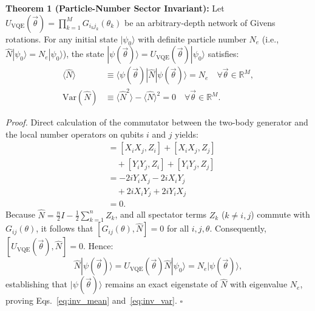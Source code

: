 \documentclass[aps,pra,reprint,superscriptaddress,floatfix,nofootinbib]{revtex4-2}
\begin{document}
\textbf{Theorem 1 (Particle-Number Sector Invariant):} 
Let $U_{\text{VQE}}(\vec{\theta}) = \prod_{k=1}^M G_{i_k j_k}(\theta_k)$ be an arbitrary-depth network of Givens rotations. For any initial state $|\psi_0\rangle$ with definite particle number $N_e$ (i.e., $\hat{N}|\psi_0\rangle = N_e |\psi_0\rangle$), the state $|\psi(\vec{\theta})\rangle = U_{\text{VQE}}(\vec{\theta})|\psi_0\rangle$ satisfies:
\begin{align}
\langle \hat{N} \rangle &\equiv \langle \psi(\vec{\theta}) | \hat{N} | \psi(\vec{\theta}) \rangle = N_e \quad \forall \vec{\theta} \in \mathbb{R}^M, \label{eq:inv_mean} \\
\text{Var}(\hat{N}) &\equiv \langle \hat{N}^2 \rangle - \langle \hat{N} \rangle^2 = 0 \quad \forall \vec{\theta} \in \mathbb{R}^M. \label{eq:inv_var}
\end{align}

\emph{Proof.} Direct calculation of the commutator between the two-body generator and the local number operators on qubits $i$ and $j$ yields:
\begin{align}
[X_i X_j + Y_i Y_j, Z_i + Z_j] &= [X_i X_j, Z_i] + [X_i X_j, Z_j] \nonumber \\
&\quad + [Y_i Y_j, Z_i] + [Y_i Y_j, Z_j] \nonumber \\
&= -2i Y_i X_j - 2i X_i Y_j \nonumber \\
&\quad + 2i X_i Y_j + 2i Y_i X_j \nonumber \\
&= 0.
\end{align}
Because $\hat{N} = \frac{n}{2} I - \frac{1}{2}\sum_{k=1}^n Z_k$, and all spectator terms $Z_k$ ($k \neq i, j$) commute with $G_{ij}(\theta)$, it follows that $[G_{ij}(\theta), \hat{N}] = 0$ for all $i, j, \theta$. Consequently, $[U_{\text{VQE}}(\vec{\theta}), \hat{N}] = 0$. Hence:
\begin{equation}
\hat{N} |\psi(\vec{\theta})\rangle = U_{\text{VQE}}(\vec{\theta}) \hat{N} |\psi_0\rangle = N_e |\psi(\vec{\theta})\rangle,
\end{equation}
establishing that $|\psi(\vec{\theta})\rangle$ remains an exact eigenstate of $\hat{N}$ with eigenvalue $N_e$, proving Eqs.~\eqref{eq:inv_mean} and~\eqref{eq:inv_var}. \hfill $\square$
\end{document}
